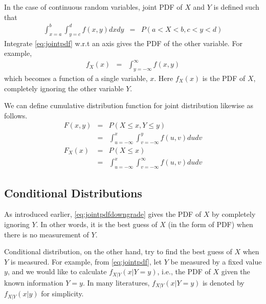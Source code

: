 In the case of continuous random variables, joint PDF of $X$ and $Y$ is defined such that
\begin{eqnarray}
  \int_{x=a}^{b}\int_{y=c}^{d} f(x, y) dxdy &=& P\left(a < X < b, c < y < d \right) \label{eq:jointpdf}
\end{eqnarray}
Integrate \eqref{eq:jointpdf} w.r.t an axis gives the PDF of the other variable. For example,
\begin{eqnarray}
  f_X(x) &=& \int_{y=-\infty}^{\infty} f(x, y) \label{eq:jointpdfdowngrade}
\end{eqnarray}
which becomes a function of a single variable, $x$. Here $f_X(x)$ is the PDF of $X$, completely ignoring the other variable $Y$.

We can define cumulative distribution function for joint distribution likewise as follows.
\begin{eqnarray}
  F(x, y) &=& P(X \leq x, Y \leq y) \nonumber \\
  &=& \int_{u=-\infty}^{x}\int_{v=-\infty}^{y}f(u, v)dudv \nonumber \\
  F_X(x) &=& P(X \leq x) \nonumber \\
  &=& \int_{u=-\infty}^{x}\int_{v=-\infty}^{\infty}f(u, v)dudv \nonumber
\end{eqnarray}

\subsection{Conditional Distributions}

As introduced earlier, \eqref{eq:jointpdfdowngrade} gives the PDF of $X$ by completely ignoring $Y$. In other words, it is the best guess of $X$ (in the form of PDF) when there is no measurement of $Y$.

Conditional distribution, on the other hand, try to find the best guess of $X$ when $Y$ is measured. For example, from \eqref{eq:jointpdf}, let $Y$ be measured by a fixed value $y$, and we would like to calculate $f_{X|Y}(x |Y=y)$, i.e., the PDF of $X$ given the known information $Y=y$. In many literatures, $f_{X|Y}(x |Y=y)$ is denoted by $f_{X|Y}(x|y)$ for simplicity.


